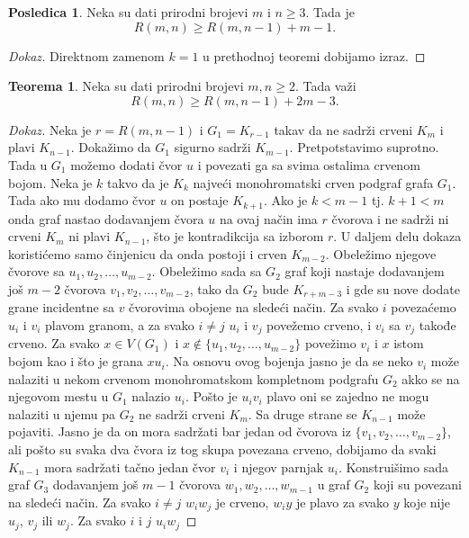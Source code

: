 \documentclass{article}
\theoremstyle{definition}
\newtheorem{teorema}{Teorema}[section]
\newtheorem{posledica}{Posledica}[teorema]
\newcommand{\dokaz}[1]{\begin{proof}[Dokaz]#1\end{proof}}
\begin{document}
	\begin{posledica}\label{pos3}
		Neka su dati prirodni brojevi $m$ i $n \geq 3$. Tada je
		$$R(m,n) \geq R(m, n - 1) + m - 1.$$
		\dokaz{
			Direktnom zamenom $k = 1$ u prethodnoj teoremi dobijamo izraz.
		}
	\end{posledica}
	\begin{teorema}\label{dot4}
		Neka su dati prirodni brojevi $m, n \geq 2$. Tada važi $$R(m,n) \geq R(m,n-1) + 2m - 3.$$
		\dokaz{
			Neka je $r = R(m, n - 1)$ i $G_1 = K_{r - 1}$ takav da ne sadrži crveni $K_m$ i plavi $K_{n-1}$. Dokažimo da $G_1$ sigurno sadrži $K_{m - 1}$.
			Pretpotstavimo suprotno. Tada u $G_1$ možemo dodati čvor $u$ i povezati ga sa svima ostalima crvenom bojom. Neka je $k$ takvo da je $K_k$
			najveći monohromatski crven podgraf grafa $G_1$. Tada ako mu dodamo čvor $u$ on postaje $K_{k + 1}$. Ako je $k < m - 1$ tj. $k + 1< m$ 				onda graf nastao dodavanjem čvora $u$ na ovaj način ima $r$ čvorova i ne sadrži ni crveni $K_m$ ni plavi $K_{n - 1}$, što je kontradikcija sa 				izborom $r$. \newline
			U daljem delu dokaza koristićemo samo činjenicu da onda postoji i crven $K_{m - 2}$. Obeležimo njegove čvorove sa $u_1, u_2, \dots,u_{m - 2}$.
			Obeležimo sada sa $G_2$ graf koji nastaje dodavanjem još $m - 2$ čvorova $v_1, v_2, \dots,v_{m - 2}$, tako da $G_2$ bude $K_{r + m - 3}$ i 
			gde su nove dodate grane incidentne sa $v$ čvorovima obojene na sledeći način.
			Za svako $i$ povezaćemo $u_i$ i $v_i$ plavom granom, a za svako $i \neq j$ $u_i$ i $v_j$ povežemo crveno, i $v_i$ sa $v_j$ takođe crveno.
			Za svako $x \in V(G_1)$ i $x \notin \{u_1, u_2, \dots,u_{m - 2}\}$ povežimo $v_i$ i $x$ istom bojom kao i što je grana $xu_i$. Na osnovu ovog 
			bojenja jasno je da se neko $v_i$ može nalaziti u nekom crvenom monohromatskom kompletnom podgrafu $G_2$ akko se na njegovom mestu
			u $G_1$ nalazio $u_i$. Pošto je $u_i v_i$ plavo oni se zajedno ne mogu nalaziti u njemu pa $G_2$ ne sadrži crveni $K_m$. Sa druge strane se
			$K_{n - 1}$ može pojaviti. Jasno je da on mora sadržati bar jedan od čvorova iz $\{v_1, v_2, \dots,v_{m - 2}\}$, ali pošto su svaka dva čvora iz
			tog skupa povezana crveno, dobijamo da svaki $K_{n - 1}$ mora sadržati tačno jedan čvor $v_i$ i njegov parnjak $u_i$. \newline
			Konstruišimo sada graf $G_3$ dodavanjem još $m - 1$ čvorova $w_1, w_2, \dots, w_{m - 1}$ u graf $G_2$ koji su povezani na 						sledeći način. Za svako $i \neq j$ $w_i w_j$ je crveno, $w_i y$ je plavo za svako $y$ koje nije $u_j$, $v_j$ ili $w_j$. Za svako $i$ i $j$ $u_i w_j$
}
\end{teorema}
\end{document}
